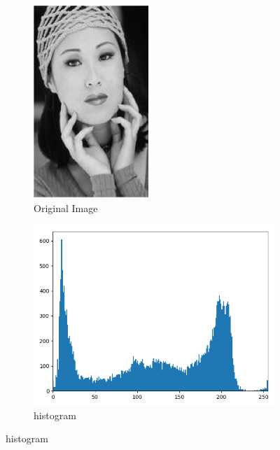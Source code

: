 \documentclass[conference]{IEEEtran}
\begin{document}
\begin{figure}
    \centering
    \begin{subfigure}{.5\linewidth}
      \centering
      \includegraphics[height=0.7\textwidth]{imgresults/face_original.png}
      \caption{Original Image}
      \label{fig:sub1}
    \end{subfigure}%
    \begin{subfigure}{.5\linewidth}
        \centering
        \includegraphics[width=1\textwidth]{imgresults/face_hist.png}
        \caption{histogram}
        \label{fig:histogram}
    \end{subfigure}
    \label{fig:sub}



\end{figure}
\end{document}

